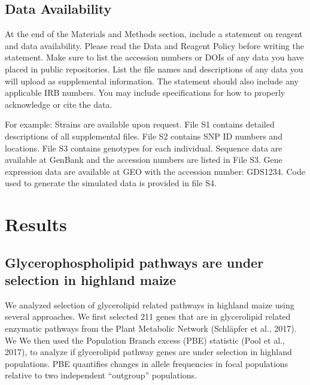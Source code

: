 \documentclass[9pt,twocolumn,twoside,lineno]{gsajnl}
\begin{document}
\subsection{Data Availability}

At the end of the Materials and Methods section, include a statement on reagent and data availability. Please read the Data and Reagent Policy before writing the statement. Make sure to list the accession numbers or DOIs of any data you have placed in public repositories. List the file names and descriptions of any data you will upload as supplemental information. The statement should also include any applicable IRB numbers. You may include specifications for how to properly acknowledge or cite the data.

For example: Strains are available upon request. File S1 contains detailed descriptions of all supplemental files. File S2 contains SNP ID numbers and locations. File S3 contains genotypes for each individual. Sequence data are available at GenBank and the accession numbers are listed in File S3. Gene expression data are available at GEO with the accession number: GDS1234. Code used to generate the simulated data is provided in file S4. 


\section{Results}
\label{sec:results}

\subsection{Glycerophospholipid pathways are under selection in  highland maize} 
We analyzed selection of glycerolipid related pathways in highland maize using several approaches. 
We first selected 211 genes that are in glycerolipid related enzymatic pathways from the Plant Metabolic Network (Schläpfer et al., 2017). 
We 
We then used the Population Branch excess (PBE) statistic (Pool et al., 2017), to analyze if glycerolipid pathway genes are under selection in highland populations. 
PBE quantifies changes in allele frequencies in focal populations relative to two independent “outgroup” populations. 
\end{document}
